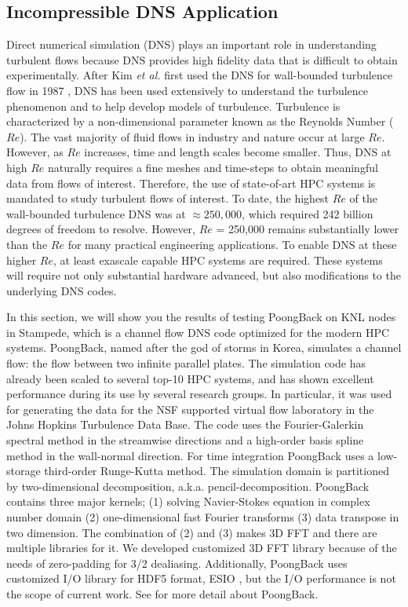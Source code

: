 \subsection{Incompressible DNS Application}
\label{sec:dns_full}

Direct numerical simulation (DNS) plays an important role in
understanding turbulent flows because DNS provides high fidelity data 
that is difficult to obtain experimentally. After Kim {\it et al.}
first used the DNS for wall-bounded turbulence flow in 1987
\cite{Kim:1987ub}, DNS has been used extensively to understand the
turbulence phenomenon and to help develop models of turbulence. 
Turbulence is characterized by a non-dimensional parameter known 
as the Reynolds Number ($Re$).  The vast majority of fluid flows 
in industry and nature occur at large $Re$. 
However, as $Re$ increases, time and length scales become smaller. 
Thus, DNS at high $Re$ naturally requires a fine meshes and time-steps 
to obtain meaningful data from flows of interest. 
Therefore, the use of state-of-art HPC systems is mandated
 to study turbulent flows of interest. To date, the highest
$Re$ of the wall-bounded turbulence DNS was at $\approx 250,000$, 
which required 242 billion degrees of freedom to 
resolve\cite{Lee:2015er}. However, $Re$ = 250,000 remains substantially 
lower than the $Re$  for many practical engineering applications. 
To enable DNS at these higher $Re$, at least exascale 
capable HPC systems are required. These systems will require
not only substantial hardware advanced, but also modifications 
to the underlying DNS codes. 

In this section, we will show you the results of testing PoongBack on
KNL nodes in Stampede, which is a channel flow DNS code optimized for
the modern HPC systems. PoongBack,
named after the god of storms in Korea, 
simulates a channel flow: the flow between two infinite 
parallel plates. The simulation code
has already been scaled to several top-10 HPC systems, and has 
shown excellent performance during its use by several research 
groups\cite{Lee:2013kv}. In particular, it was used for
generating the data for the NSF supported virtual flow laboratory in the 
Johns Hopkins Turbulence Data Base\cite{Graham:2015ha}.
The code uses the Fourier-Galerkin spectral method in the streamwise directions 
and a high-order basis spline method in the wall-normal direction. 
For time integration PoongBack uses a low-storage
third-order Runge-Kutta method. The simulation domain is partitioned by
two-dimensional decomposition, a.k.a. pencil-decomposition. PoongBack
contains three major kernels; (1) solving Navier-Stokes equation in
complex number domain (2) one-dimensional fast Fourier transforms (3)
data transpose in two dimension. The combination of (2) and (3) makes 3D
FFT and there are multiple libraries for it. We developed customized 3D
FFT library because of the needs of zero-padding for 3/2
dealiasing. Additionally, PoongBack uses customized I/O library for HDF5
format, ESIO \cite{Lee:2014ta}, but the I/O performance is not the scope
of current work. See \cite{Lee:2013kv,Lee:2014ta} for more detail about
PoongBack.     

